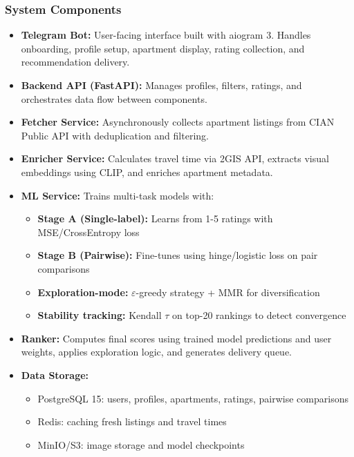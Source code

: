 \documentclass[12pt,a4paper]{article}
\begin{document}
\subsubsection{System Components}

\begin{itemize}
    \item \textbf{Telegram Bot:} User-facing interface built with aiogram 3. Handles onboarding, profile setup, apartment display, rating collection, and recommendation delivery.
    
    \item \textbf{Backend API (FastAPI):} Manages profiles, filters, ratings, and orchestrates data flow between components.
    
    \item \textbf{Fetcher Service:} Asynchronously collects apartment listings from CIAN Public API with deduplication and filtering.
    
    \item \textbf{Enricher Service:} Calculates travel time via 2GIS API, extracts visual embeddings using CLIP, and enriches apartment metadata.
    
    \item \textbf{ML Service:} Trains multi-task models with:
    \begin{itemize}
        \item \textbf{Stage A (Single-label):} Learns from 1-5 ratings with MSE/CrossEntropy loss
        \item \textbf{Stage B (Pairwise):} Fine-tunes using hinge/logistic loss on pair comparisons
        \item \textbf{Exploration-mode:} $\varepsilon$-greedy strategy + MMR for diversification
        \item \textbf{Stability tracking:} Kendall $\tau$ on top-20 rankings to detect convergence
    \end{itemize}
    
    \item \textbf{Ranker:} Computes final scores using trained model predictions and user weights, applies exploration logic, and generates delivery queue.
    
    \item \textbf{Data Storage:}
    \begin{itemize}
        \item PostgreSQL 15: users, profiles, apartments, ratings, pairwise comparisons
        \item Redis: caching fresh listings and travel times
        \item MinIO/S3: image storage and model checkpoints
    \end{itemize}
\end{itemize}
\end{document}

